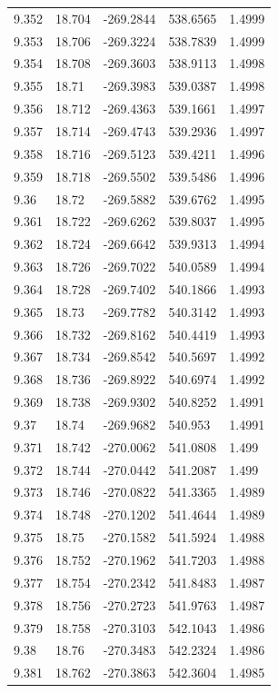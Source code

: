 \begin{tabular}{lllll}
9.352 & 18.704 & -269.2844 & 538.6565 & 1.4999 \\
9.353 & 18.706 & -269.3224 & 538.7839 & 1.4999 \\
9.354 & 18.708 & -269.3603 & 538.9113 & 1.4998 \\
9.355 & 18.71 & -269.3983 & 539.0387 & 1.4998 \\
9.356 & 18.712 & -269.4363 & 539.1661 & 1.4997 \\
9.357 & 18.714 & -269.4743 & 539.2936 & 1.4997 \\
9.358 & 18.716 & -269.5123 & 539.4211 & 1.4996 \\
9.359 & 18.718 & -269.5502 & 539.5486 & 1.4996 \\
9.36 & 18.72 & -269.5882 & 539.6762 & 1.4995 \\
9.361 & 18.722 & -269.6262 & 539.8037 & 1.4995 \\
9.362 & 18.724 & -269.6642 & 539.9313 & 1.4994 \\
9.363 & 18.726 & -269.7022 & 540.0589 & 1.4994 \\
9.364 & 18.728 & -269.7402 & 540.1866 & 1.4993 \\
9.365 & 18.73 & -269.7782 & 540.3142 & 1.4993 \\
9.366 & 18.732 & -269.8162 & 540.4419 & 1.4993 \\
9.367 & 18.734 & -269.8542 & 540.5697 & 1.4992 \\
9.368 & 18.736 & -269.8922 & 540.6974 & 1.4992 \\
9.369 & 18.738 & -269.9302 & 540.8252 & 1.4991 \\
9.37 & 18.74 & -269.9682 & 540.953 & 1.4991 \\
9.371 & 18.742 & -270.0062 & 541.0808 & 1.499 \\
9.372 & 18.744 & -270.0442 & 541.2087 & 1.499 \\
9.373 & 18.746 & -270.0822 & 541.3365 & 1.4989 \\
9.374 & 18.748 & -270.1202 & 541.4644 & 1.4989 \\
9.375 & 18.75 & -270.1582 & 541.5924 & 1.4988 \\
9.376 & 18.752 & -270.1962 & 541.7203 & 1.4988 \\
9.377 & 18.754 & -270.2342 & 541.8483 & 1.4987 \\
9.378 & 18.756 & -270.2723 & 541.9763 & 1.4987 \\
9.379 & 18.758 & -270.3103 & 542.1043 & 1.4986 \\
9.38 & 18.76 & -270.3483 & 542.2324 & 1.4986 \\
9.381 & 18.762 & -270.3863 & 542.3604 & 1.4985 \\

\end{tabular}
